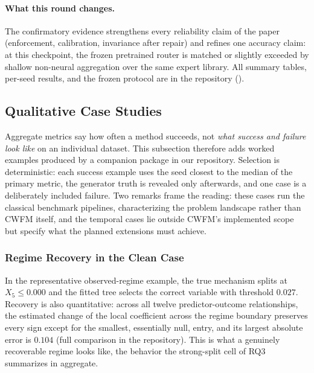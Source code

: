 \documentclass[electronics,article,submit,oneauthor]{Definitions/mdpi}
\begin{document}
\paragraph{What this round changes.} The confirmatory evidence strengthens every reliability claim of the paper (enforcement, calibration, invariance after repair) and refines one accuracy claim: at this checkpoint, the frozen pretrained router is matched or slightly exceeded by shallow non-neural aggregation over the same expert library. All summary tables, per-seed results, and the frozen protocol are in the repository ().

\subsection{Qualitative Case Studies}\label{sec:assessment-qualitative}

Aggregate metrics say how often a method succeeds, not \emph{what success and failure look like} on an individual dataset. This subsection therefore adds worked examples produced by a companion package in our repository. Selection is deterministic: each success example uses the seed closest to the median of the primary metric, the generator truth is revealed only afterwards, and one case is a deliberately included failure. Two remarks frame the reading: these cases run the classical benchmark pipelines, characterizing the problem landscape rather than CWFM itself, and the temporal cases lie outside CWFM's implemented scope but specify what the planned extensions must achieve.

\subsubsection{Regime Recovery in the Clean Case}
In the representative observed-regime example, the true mechanism splits at $X_5 \leq 0.000$ and the fitted tree selects the correct variable with threshold $0.027$. Recovery is also quantitative: across all twelve predictor-outcome relationships, the estimated change of the local coefficient across the regime boundary preserves every sign except for the smallest, essentially null, entry, and its largest absolute error is $0.104$ (full comparison in the repository). This is what a genuinely recoverable regime looks like, the behavior the strong-split cell of RQ3 summarizes in aggregate.
\end{document}
